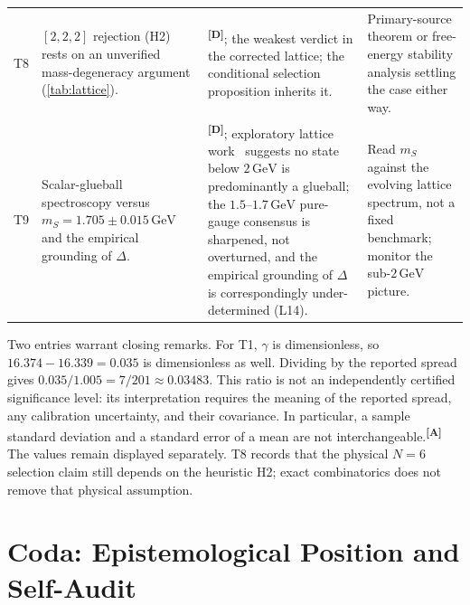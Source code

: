 \documentclass[12pt,a4paper,twoside]{article}
\theoremstyle{plain}
\theoremstyle{definition}
\theoremstyle{remark}
\newcommand{\GeV}{\,\mathrm{GeV}}
\newcommand{\catmark}[1]{\textsuperscript{\textsf{\textbf{[#1]}}}}
\begin{document}
{\begin{longtable}{p{} p{} p{} p{}}
T8 & $[2,2,2]$ rejection (H2) rests on an unverified mass-degeneracy argument (\cref{tab:lattice}). & \catmark{D}; the weakest verdict in the corrected lattice; the conditional selection proposition inherits it. & Primary-source theorem or free-energy stability analysis settling the case either way. \\
T9 & Scalar-glueball spectroscopy versus $m_S = 1.705 \pm 0.015\GeV$ and the empirical grounding of $\Delta$. & \catmark{D}; exploratory lattice work~\cite{morningstar2024} suggests no state below $2\,\mathrm{GeV}$ is predominantly a glueball; the $1.5$--$1.7\,\mathrm{GeV}$ pure-gauge consensus is sharpened, not overturned, and the empirical grounding of $\Delta$ is correspondingly under-determined (L14). & Read $m_S$ against the evolving lattice spectrum, not a fixed benchmark; monitor the sub-$2\,\mathrm{GeV}$ picture. \\
\end{longtable}
}

\noindent Two entries warrant closing remarks. For T1, $\gamma$ is
dimensionless, so $16.374-16.339=0.035$ is dimensionless as well.
Dividing by the reported spread gives $0.035/1.005=7/201\approx0.03483$.
This ratio is not an independently certified significance level: its
interpretation requires the meaning of the reported spread, any calibration
uncertainty, and their covariance. In particular, a sample standard deviation
and a standard error of a mean are not interchangeable.\catmark{A}
The values remain displayed separately. T8 records that the physical $N=6$
selection claim still depends on the heuristic H2; exact combinatorics does
not remove that physical assumption.



\newpage


\newpage
\part*{Coda: Epistemological Position and Self-Audit}
\label{part:coda}
\end{document}
